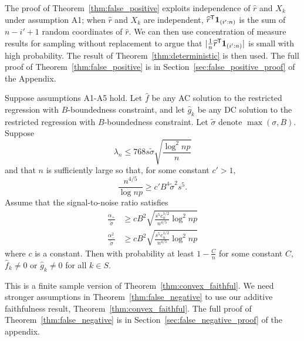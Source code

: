 The proof of Theorem~\ref{thm:false_positive} exploits independence of
$\hat{r}$ and $X_k$ under assumption A1; when $\hat{r}$ and $X_k$ are independent,
$\widehat{r}^{\mathsf{T}} \mbox{\boldmath $1$}_{(i':n)}$ is the sum of $n - i' +1$ random
coordinates of $\hat{r}$.  We can then use concentration of
measure results for sampling without replacement to argue that $|
\frac{1}{n} \widehat{r}^{\mathsf{T}}\mbox{\boldmath $1$}_{(i':n)}|$ is small with high
probability. The result of Theorem~\ref{thm:deterministic} is then
used. The full proof of Theorem~\ref{thm:false_positive} is in
Section~\ref{sec:false_positive_proof} of the Appendix.

\begin{theorem}
\label{thm:false_negative}
Suppose assumptions A1-A5 hold. Let $\hat{f}$ be any AC solution to
the restricted regression with $B$-boundedness constraint, and let
$\hat{g}_k$ be any DC solution to the restricted regression with
$B$-boundedness constraint. Let $\tilde{\sigma}$ denote $\max(\sigma,
B)$.  Suppose 
\begin{equation}
\lambda_n \leq 768 s \tilde{\sigma} \sqrt{\frac{\log^2 np}{n}}
\end{equation}
and that $n$ is sufficiently large so that, for some constant $c' > 1$,
\begin{equation}
\frac{n^{4/5}}{\log np} \geq c' B^4 \tilde{\sigma}^2 s^5.
\end{equation}
Assume that the signal-to-noise ratio satisfies
\begin{align}
\frac{\alpha_{+}}{\tilde{\sigma}} & \geq c B^2
\sqrt{\frac{s^5 c_u^{1/2}}{n^{4/5}} \log^2 np}\\
\frac{\alpha_{-}^2}{\tilde{\sigma}} &\geq c B^2
\sqrt{\frac{s^5 c_u^{1/2}}{n^{4/5}} \log^2 np}
\end{align}
where $c$ is a constant.  Then with probability at least $1 -
\frac{C}{n}$ for some constant $C$, 
$\hat{f}_k \neq 0$ or $\hat{g}_k \neq 0$ 
for all $k \in S$.
\end{theorem}

This is a finite sample version of
Theorem~\ref{thm:convex_faithful}. We need stronger assumptions in
Theorem~\ref{thm:false_negative} to use our additive faithfulness
result, Theorem~\ref{thm:convex_faithful}. The full proof of Theorem~\ref{thm:false_negative} is in Section~\ref{sec:false_negative_proof} of the appendix.


